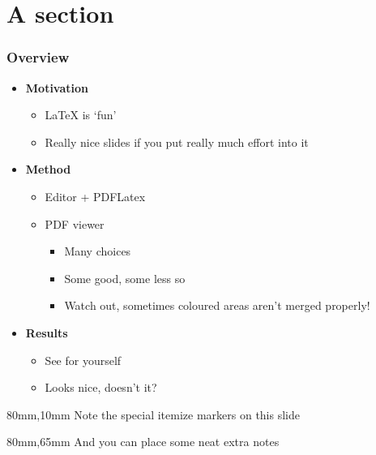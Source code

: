 \documentclass[mathserif, fleqn]{beamer}
\begin{document}
\begin{frame}
  \titlepage
\end{frame}

\section{A section}
\begin{frame}\frametitle{Overview}
  
  \begin{itemize}\setlength{\itemsep}{1.5ex}
  \item \textbf{Motivation}
    \begin{itemize}\setlength{\itemsep}{1ex}
    \item \LaTeX{} is `fun'
    \item Really nice slides if you put really much effort into it
    \end{itemize}
  \item \textbf{Method}
    \begin{itemize}\setlength{\itemsep}{1ex}
    \item Editor + PDFLatex
    \item PDF viewer
      \begin{itemize}
      \item Many choices
      \item Some good, some less so
      \item Watch out, sometimes coloured areas aren't merged properly!
      \end{itemize}
    \end{itemize}
  \item \textbf{Results}
    \begin{itemize}\setlength{\itemsep}{1ex}
    \item See for yourself
    \item Looks nice, doesn't it?
    \end{itemize}
  \end{itemize}

  \begin{aside}{40mm}{80mm,10mm}
    Note the special itemize markers on this slide
  \end{aside}

  \begin{aside}{30mm}{80mm,65mm}
    And you can place some neat extra notes
  \end{aside}
\end{frame}
\end{document}
